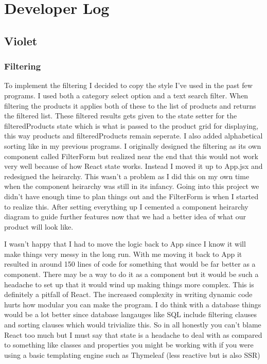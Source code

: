 \documentclass{article}[12pt]
\begin{document}
\section{Developer Log}
\subsection{Violet}
\subsubsection{Filtering}
To implement the filtering I decided to copy the style I've used in the past few programs. I used both a category select option and a text search filter. When filtering the products it applies both of these to the list of products and returns the filtered list. These filtered results gets given to the state setter for the filteredProducts state which is what is passed to the product grid for displaying, this way products and filteredProducts remain seperate. I also added alphabetical sorting like in my previous programs. I originally designed the filtering as its own component called FilterForm but realized near the end that this would not work very well because of how React state works. Instead I moved it up to App.jsx and redesigned the heirarchy. This wasn't a problem as I did this on my own time when the component heirarchy was still in its infancy. Going into this project we didn't have enough time to plan things out and the FilterForm is when I started to realize this. After setting everything up I cemented a component heirarchy diagram to guide further features now that we had a better idea of what our product will look like.

I wasn't happy that I had to move the logic back to App since I know it will make things very messy in the long run. With me moving it back to App it resulted in around 150 lines of code for something that would be far better as a component. There may be a way to do it as a component but it would be such a headache to set up that it would wind up making things more complex. This is definitely a pitfall of React. The increased complexity in writing dynamic code hurts how modular you can make the program. I do think with a database things would be a lot better since database langauges like SQL include filtering clauses and sorting clauses which would trivialize this. So in all honestly you can't blame React too much but I must say that state is a headache to deal with as compared to something like classes and properties you might be working with if you were using a basic templating engine such as Thymeleaf (less reactive but is also SSR)
\end{document}
